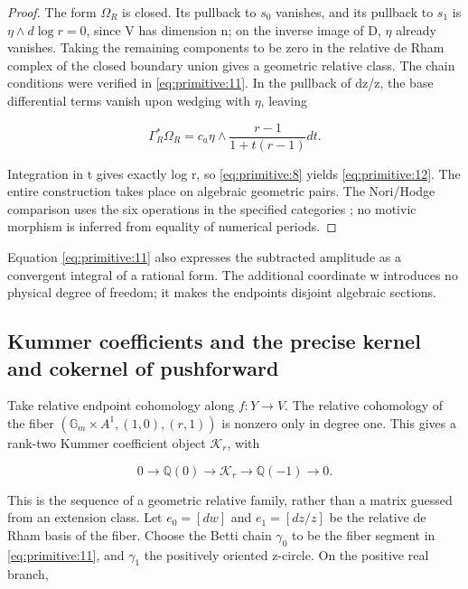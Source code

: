 \documentclass[11pt,a4paper,oneside]{article}
\theoremstyle{plain}
\theoremstyle{definition}
\theoremstyle{remark}
\numberwithin{equation}{section}
\begin{document}
\begin{proof}

The form \(\Omega _R\) is closed. Its pullback to \(s_0\) vanishes, and its pullback to \(s_1\) is \(\eta \wedge d\log  r=0\), since V has dimension n; on the inverse image of D, \(\eta \) already vanishes. Taking the remaining components to be zero in the relative de Rham complex of the closed boundary union gives a geometric relative class. The chain conditions were verified in \eqref{eq:primitive:11}. In the pullback of dz/z, the base differential terms vanish upon wedging with \(\eta \), leaving

\begin{equation}
\Gamma_R^*\Omega_R=c_a\eta\wedge
                  \frac{r-1}{1+t(r-1)}dt.
\end{equation}

Integration in t gives exactly log r, so \eqref{eq:primitive:8} yields \eqref{eq:primitive:12}. The entire construction takes place on algebraic geometric pairs. The Nori/Hodge comparison uses the six operations in the specified categories \cite{tubach}; no motivic morphism is inferred from equality of numerical periods.

\end{proof}

Equation \eqref{eq:primitive:11} also expresses the subtracted amplitude as a convergent integral of a rational form. The additional coordinate w introduces no physical degree of freedom; it makes the endpoints disjoint algebraic sections.


\subsection{Kummer coefficients and the precise kernel and cokernel of pushforward}\label{sec:primitive:5}

Take relative endpoint cohomology along \(f:Y\to V\). The relative cohomology of the fiber \((\mathbb G_m\times A^{1},{(1,0),(r,1)})\) is nonzero only in degree one. This gives a rank-two Kummer coefficient object \(\mathcal K_r\), with

\begin{equation}
0\longrightarrow\mathbb Q(0)\longrightarrow\mathcal K_r
                      \longrightarrow\mathbb Q(-1)\longrightarrow0.       \label{eq:primitive:13}
\end{equation}

This is the sequence of a geometric relative family, rather than a matrix guessed from an extension class. Let \(e_0=[dw]\) and \(e_1=[dz/z]\) be the relative de Rham basis of the fiber. Choose the Betti chain \(\gamma _0\) to be the fiber segment in \eqref{eq:primitive:11}, and \(\gamma _1\) the positively oriented z-circle. On the positive real branch,
\end{document}
